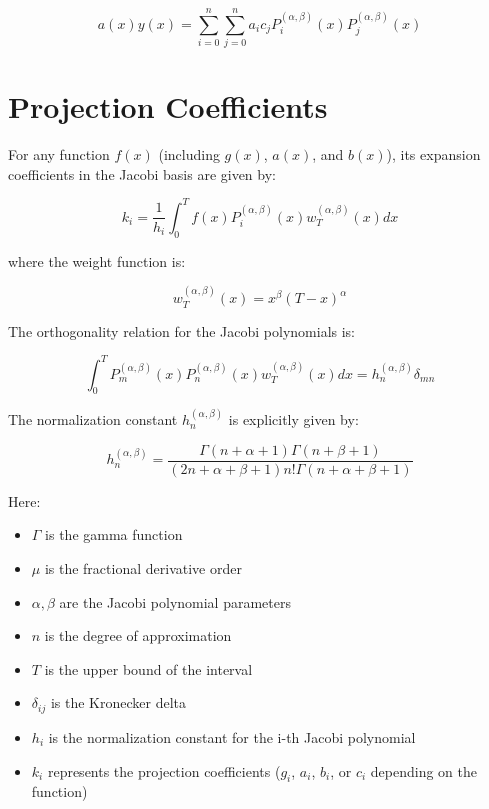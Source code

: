 \documentclass{article}
\begin{document}
\[ a(x)y(x) = \sum_{i=0}^{n}\sum_{j=0}^{n} a_ic_j P_i^{(\alpha,\beta)}(x)P_j^{(\alpha,\beta)}(x) \]

\section{Projection Coefficients}

For any function $f(x)$ (including $g(x)$, $a(x)$, and $b(x)$), its expansion coefficients in the Jacobi basis are given by:

\[ k_i = \frac{1}{h_i}\int_0^T f(x)P_i^{(\alpha,\beta)}(x)w_T^{(\alpha,\beta)}(x)dx \]

where the weight function is:

\[ w_T^{(\alpha,\beta)}(x) = x^\beta(T-x)^\alpha \]

The orthogonality relation for the Jacobi polynomials is:

\[ \int_0^T P_m^{(\alpha,\beta)}(x)P_n^{(\alpha,\beta)}(x)w_T^{(\alpha,\beta)}(x)dx = h_n^{(\alpha,\beta)}\delta_{mn} \]

The normalization constant $h_n^{(\alpha,\beta)}$ is explicitly given by:

\[ h_n^{(\alpha,\beta)} = \frac{\Gamma(n+\alpha+1)\Gamma(n+\beta+1)}{(2n+\alpha+\beta+1)n!\Gamma(n+\alpha+\beta+1)} \]

Here:
\begin{itemize}
\item $\Gamma$ is the gamma function
\item $\mu$ is the fractional derivative order
\item $\alpha, \beta$ are the Jacobi polynomial parameters
\item $n$ is the degree of approximation
\item $T$ is the upper bound of the interval
\item $\delta_{ij}$ is the Kronecker delta
\item $h_i$ is the normalization constant for the i-th Jacobi polynomial
\item $k_i$ represents the projection coefficients ($g_i$, $a_i$, $b_i$, or $c_i$ depending on the function)
\end{itemize}
\end{document}
